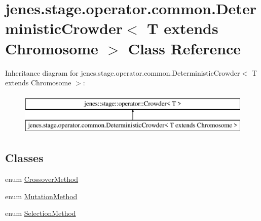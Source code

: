 \hypertarget{classjenes_1_1stage_1_1operator_1_1common_1_1_deterministic_crowder_3_01_t_01extends_01_chromosome_01_4}{\section{jenes.\-stage.\-operator.\-common.\-Deterministic\-Crowder$<$ T extends Chromosome $>$ Class Reference}
\label{classjenes_1_1stage_1_1operator_1_1common_1_1_deterministic_crowder_3_01_t_01extends_01_chromosome_01_4}
}
Inheritance diagram for jenes.\-stage.\-operator.\-common.\-Deterministic\-Crowder$<$ T extends Chromosome $>$\-:\begin{figure}[H]
\begin{center}
\leavevmode
\includegraphics[height=2.000000cm]{classjenes_1_1stage_1_1operator_1_1common_1_1_deterministic_crowder_3_01_t_01extends_01_chromosome_01_4}
\end{center}
\end{figure}
\subsection*{Classes}
\begin{DoxyCompactItemize}
\item 
enum \hyperlink{enumjenes_1_1stage_1_1operator_1_1common_1_1_deterministic_crowder_3_01_t_01extends_01_chromosome_01_4_1_1_crossover_method}{Crossover\-Method}
\item 
enum \hyperlink{enumjenes_1_1stage_1_1operator_1_1common_1_1_deterministic_crowder_3_01_t_01extends_01_chromosome_01_4_1_1_mutation_method}{Mutation\-Method}
\item 
enum \hyperlink{enumjenes_1_1stage_1_1operator_1_1common_1_1_deterministic_crowder_3_01_t_01extends_01_chromosome_01_4_1_1_selection_method}{Selection\-Method}
\end{DoxyCompactItemize}
